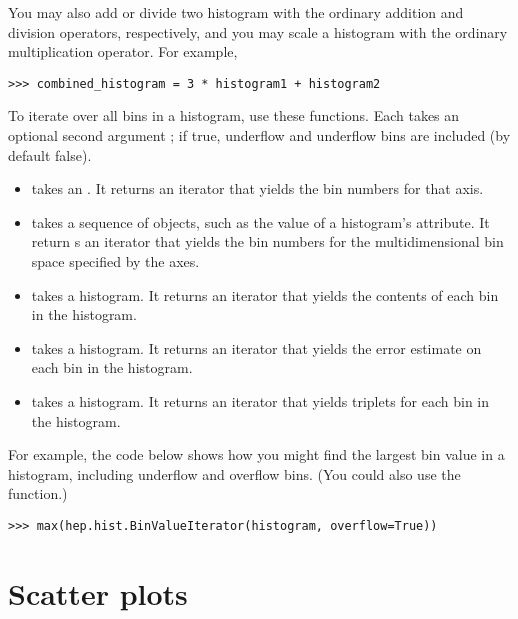 You may also add or divide two histogram with the ordinary addition and
division operators, respectively, and you may scale a histogram with the
ordinary multiplication operator.  For example,
\begin{verbatim}
>>> combined_histogram = 3 * histogram1 + histogram2
\end{verbatim}

To iterate over all bins in a histogram, use these functions.  Each
takes an optional second argument ; if true, underflow
and underflow bins are included (by default false).
\begin{itemize}
  \item {} takes an .  It returns an
  iterator that yields the bin numbers for that axis.

  \item {} takes a sequence of  objects,
  such as the value of a histogram's  attribute.  It return
  s an iterator that yields the bin numbers for the multidimensional bin
  space specified by the axes.

  \item {} takes a histogram.  It returns an
  iterator that yields the contents of each bin in the histogram.

  \item {} takes a histogram.  It returns an
  iterator that yields the error estimate on each bin in the histogram.

  \item {} takes a histogram.  It returns an
  iterator that yields triplets  for
  each bin in the histogram.

\end{itemize}

For example, the code below shows how you might find the largest bin
value in a histogram, including underflow and overflow bins.  (You could
also use the  function.)
\begin{verbatim}
>>> max(hep.hist.BinValueIterator(histogram, overflow=True))
\end{verbatim}


\section{Scatter plots}

